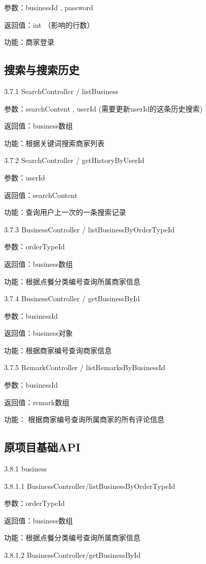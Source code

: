     参数：businessId , password

    返回值：int （影响的行数）

    功能：商家登录
    \subsection{搜索与搜索历史}

    3.7.1 SearchController / listBusiness

    参数：searchContent , userId (需要更新userId的这条历史搜索)

    返回值：business数组

    功能：根据关键词搜索商家列表

    3.7.2 SearchController / getHistoryByUserId

    参数：userId

    返回值：searchContent

    功能：查询用户上一次的一条搜索记录

    3.7.3 BusinessController / listBusinessByOrderTypeId

    参数：orderTypeId

    返回值：business数组

    功能：根据点餐分类编号查询所属商家信息

    3.7.4 BusinessController / getBusinessById

    参数：businessId

    返回值：business对象

    功能：根据商家编号查询商家信息

    3.7.5 RemarkController / listRemarksByBusinessId

    参数：businessId

    返回值：remark数组

    功能： 根据商家编号查询所属商家的所有评论信息
    \subsection{原项目基础API}

    \protect\hypertarget{2.3.1.business}{}{}3.8.1 business

    3.8.1.1 BusinessController/listBusinessByOrderTypeId

    参数：orderTypeId

    返回值：business数组

    功能：根据点餐分类编号查询所属商家信息

    3.8.1.2 BusinessController/getBusinessById

